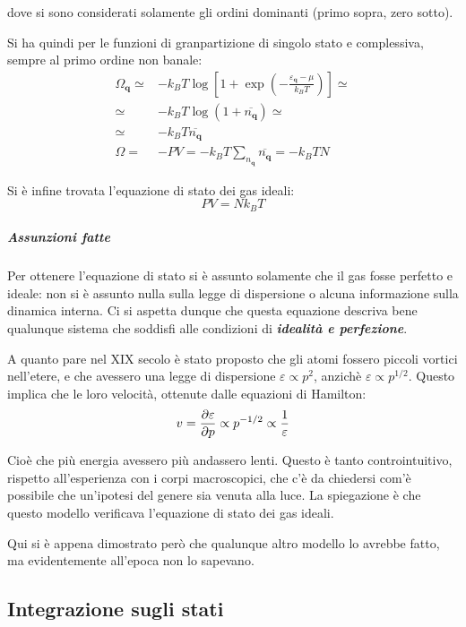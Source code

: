 \noindent dove si sono considerati solamente gli ordini dominanti (primo sopra, zero sotto).

Si ha quindi per le funzioni di granpartizione di singolo stato e complessiva, sempre al primo ordine non banale:
\begin{align*}
\Omega_{\textbf{q}} \simeq& - k_B T \log \left[ 1 + \exp \left( - \frac{{\varepsilon_{\textbf{q}} - \mu}}{k_B T}\right)\right] \simeq\\
\simeq&- k_B T \log (1 + \overline{n_{\textbf{q}}}) \simeq\\
\simeq&-k_B T \overline{n_{\textbf{q}}}\\
\Omega =& - P V = - k_B T \sum_{n_{\textbf{q}}} \overline{n_{\textbf{q}}}= - k_B T N
\end{align*}

Si è infine trovata l'equazione di stato dei gas ideali:
\begin{equation*}
P V = N k_B T
\end{equation*}

\subparagraph{Assunzioni fatte} Per ottenere l'equazione di stato si è assunto solamente che il gas fosse perfetto e ideale: non si è assunto nulla sulla legge di dispersione o alcuna informazione sulla dinamica interna. Ci si aspetta dunque che questa equazione descriva bene qualunque sistema che soddisfi alle condizioni di \textbf{\textit{idealità e perfezione}}.
\newline

A quanto pare nel XIX secolo è stato proposto che gli atomi fossero piccoli vortici nell'etere, e che avessero una legge di dispersione $\varepsilon \propto p^2$, anzichè $\varepsilon \propto p^{1/2}$. Questo implica che le loro velocità, ottenute dalle equazioni di Hamilton:
\begin{equation*}
v = \frac{\partial {\varepsilon}}{\partial {p}} \propto p^{-1/2} \propto \frac{1}{\varepsilon}
\end{equation*}

Cioè che più energia avessero più andassero lenti. Questo è tanto controintuitivo, rispetto all'esperienza con i corpi macroscopici, che c'è da chiedersi com'è possibile che un'ipotesi del genere sia venuta alla luce. La spiegazione è che questo modello verificava l'equazione di stato dei gas ideali.

Qui si è appena dimostrato però che qualunque altro modello lo avrebbe fatto, ma evidentemente all'epoca non lo sapevano.

\subsection{Integrazione sugli stati}
\label{sec:sumasint}

